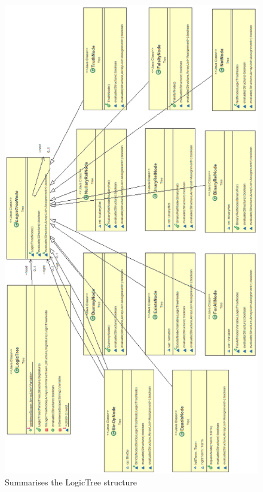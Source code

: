 \documentclass{report}
\begin{document}
\begin{figure}[h!]
\centering \includegraphics[height=\textheight]{treeNodes.png}
\caption{Summarises the LogicTree structure}
\end{figure}
\newpage
\end{document}
